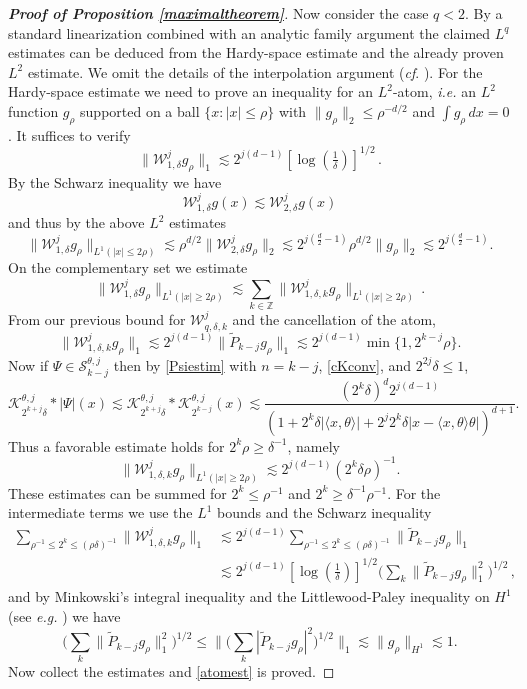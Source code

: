 \documentclass[11pt]{amsart}
\theoremstyle{definition}
\numberwithin{theorem}{section}
\numberwithin{definition}{section}
\def\inn#1#2{\langle#1,#2\rangle}
\newcommand{\Be}{\begin{equation}}
\newcommand{\Ee}{\end{equation}}
\newcommand{\note}[1]{\footnote{\texttt{\Small #1}}}
\def\cf{{\it cf}}
\def\inn#1#2{\langle#1,#2\rangle}
\def\lc{\lesssim}
\def\bbZ{{\mathbb {Z}}}
\def\cK{{\mathcal {K}}}
\def\cS{{\mathcal {S}}}
\def\cW{{\mathcal {W}}}
\begin{document}
\begin{proof}[\bf Proof of Proposition \ref {maximaltheorem}]
Now consider the case $q<2$.
By a standard linearization combined with an analytic family argument the claimed $L^q$  estimates can be deduced from the   Hardy-space estimate
 and the already proven $L^2$ estimate. We omit the details of the interpolation argument (\cf. \cite{fest}).
For the Hardy-space estimate
we need to prove an inequality for an $L^2$-atom,
{\it i.e.}
 an  $L^2$ function   $g_\rho$
supported on a ball $\{x:|x|\le \rho\}$ with
$\|g_\rho\|_2\le \rho^{-d/2}$ and $\int g_\rho\,dx=0$.
It suffices to verify
\Be\label{atomest}
\|\cW_{1, \delta}^j g_\rho\|_1\lc 2^{j(d -1)} [\log(\tfrac {1}{\delta})]^{1/2}\,.
\Ee
By the Schwarz inequality we have
$$\cW_{1,\delta}^j g(x) \lc \cW_{2,\delta}^j g(x)$$ and thus by the above $L^2$ estimates
$$
\|\cW_{1,\delta}^j g_\rho\|_{L^1(|x|\le 2 \rho)}
\lc \rho^{d/2}
\|\cW_{2,\delta}^j g_\rho\|_{2} \lc 2^{j(\frac d2 -1)} \rho^{d/2}\|g_\rho\|_2
\lc 2^{j(\frac d2 -1)}.$$
On the complementary set we estimate
$$\|\cW_{1,\delta}^j g_\rho\|_{L^1(|x|\ge 2 \rho)} \lc
\sum_{k\in \bbZ}
\|\cW_{1,\delta,k}^j g_\rho\|_{L^1(|x|\ge 2 \rho)}\,.$$
From our previous bound for $\cW^j_{q,\delta,k}$ and
the cancellation of the atom,
$$
\|\cW_{1,\delta,k}^j g_\rho\|_1
 \lc 2^{j(d-1)}  \|\widetilde P_{k-j}g_\rho\|_1
\lc 2^{j(d-1)} \min \{1, 2^{k-j}\rho\}.
$$
Now if $\Psi\in \cS^{\theta,j}_{k-j}$ then by
\eqref{Psiestim} with $n=k-j$,
\eqref{cKconv},  and $2^{2j}\delta\le 1$,
$$
\cK^{\theta,j}_{2^{k+j}\delta}*
|\Psi| (x) \lc
\cK^{\theta,j}_{2^{k+j}\delta}*\cK^{\theta,j}_{2^{k-j}}(x) \lc
\frac{(2^k\delta)^d 2^{j(d-1)}}
{(1+ 2^k\delta|\inn{x}{\theta}| +2^j 2^k\delta
|x-\inn{x}{\theta}\theta|)^{d+1}}.
$$
Thus a favorable estimate holds for $2^{k}\rho\ge \delta^{-1}$, namely
$$
\|\cW_{1,\delta,k}^j g_\rho\|_{L^1(|x|\ge 2 \rho)}
\lc 2^{j(d-1)} ( 2^{k}\delta\rho)^{-1}.
$$
These estimates can be summed for $2^k\le \rho^{-1}$ and
$2^k\ge \delta^{-1}\rho^{-1}$.
For the intermediate terms we use the $L^1$ bounds and the Schwarz
inequality
  \begin{align*}
\sum_{\rho^{-1}\le 2^k\le (\rho\delta)^{-1}}
\|\cW_{1,\delta,k}^j g_\rho\|_1
 &\lc 2^{j(d-1)}\sum_{\rho^{-1}\le 2^k\le (\rho\delta)^{-1}}
  \|\widetilde P_{k-j}g_\rho\|_1
\\
&\lc 2^{j(d-1)}[\log (\tfrac{1}{\delta})]^{1/2}
 \Big(\sum_k \|\widetilde P_{k-j}g_\rho\|_1^2\Big)^{1/2}\, ,
\end{align*}
and by Minkowski's integral inequality
and the Littlewood-Paley
inequality  on $H^1$ (see {\it e.g.} \cite{gcrdf})
we have
\Be\label{LPHardy}
 \Big(\sum_k \|\widetilde P_{k-j}g_\rho\|_1^2\Big)^{1/2}\le
\Big\| \Big(\sum_k |\widetilde P_{k-j}g_\rho|^2\Big)^{1/2}\Big\|_1
\lc \|g_\rho\|_{H^1} \lc 1.
\Ee
Now  collect the estimates and  \eqref{atomest} is proved.


\end{proof}
\end{document}
